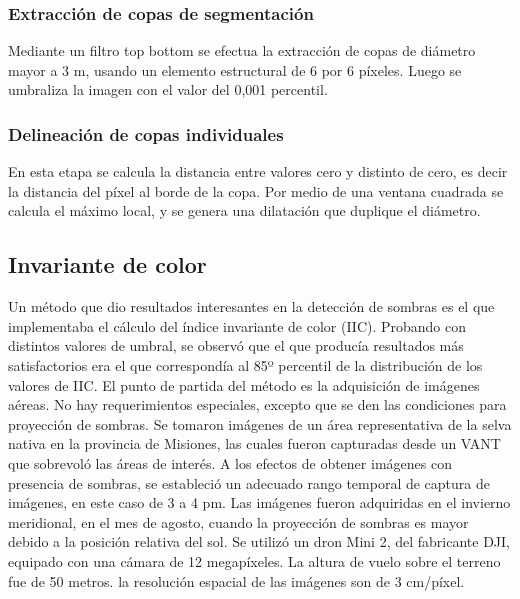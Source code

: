 \subsubsection{Extracción de copas de segmentación}
Mediante un filtro top bottom se efectua la extracción de copas de diámetro mayor a 3 m, usando un elemento estructural de 6 por 6 píxeles. Luego se umbraliza la imagen con el valor del 0,001 percentil.
\subsubsection{Delineación de copas individuales}
En esta etapa se calcula la distancia entre valores cero y distinto de cero, es decir la distancia del píxel al borde de la copa. Por medio de una ventana cuadrada se calcula el máximo local, y se genera una dilatación que duplique el diámetro.





\subsection{Invariante de color} \label{Metodología IIC}
Un método que dio resultados interesantes en la detección de sombras es el que implementaba el cálculo del índice invariante de color (IIC). Probando con distintos valores de umbral, se observó que el que producía resultados más satisfactorios era el que correspondía al 85º percentil de la distribución de los valores de IIC.
El punto de partida del método es la adquisición de imágenes aéreas. No hay requerimientos especiales, excepto que se den las condiciones para proyección de sombras. Se tomaron imágenes de un área representativa de la selva nativa en la provincia de Misiones, las cuales fueron capturadas desde un VANT que sobrevoló las áreas de interés. A los efectos de obtener imágenes con presencia de sombras, se estableció un adecuado rango temporal de captura de imágenes, en este caso de 3 a 4 pm. Las imágenes fueron adquiridas en el invierno meridional, en el mes de agosto, cuando la proyección de sombras es mayor debido a la posición relativa del sol. Se utilizó un dron Mini 2, del fabricante DJI, equipado con una cámara de 12 megapíxeles. La altura de vuelo sobre el terreno fue de 50 metros. la resolución espacial de las imágenes son de 3 cm/píxel.

